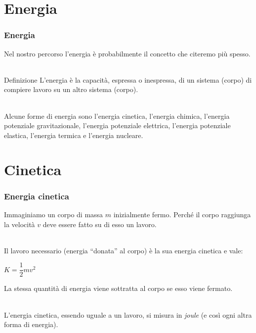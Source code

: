\documentclass[]{beamer}
\theoremstyle{plain}
\begin{document}
\section{Energia}


\begin{frame}
  \frametitle{Energia}
Nel nostro percorso l'energia è probabilmente il concetto che citeremo più spesso.\\~\pause
\begin{block}{Definizione}
  L'energia è la capacità, espressa o inespressa, di un sistema (corpo) di compiere lavoro su un altro sistema (corpo).
\end{block}~\pause\\
Alcune forme di energia sono l'energia cinetica, l'energia chimica, l'energia potenziale gravitazionale, l'energia potenziale elettrica, l'energia potenziale elastica, l'energia termica e l'energia nucleare.
\end{frame}

\section{Cinetica}

\begin{frame}
\frametitle{Energia cinetica}
Immaginiamo un corpo di massa $ m $ inizialmente fermo. Perché il corpo raggiunga la velocità $ v $ deve essere fatto su di esso un lavoro.\\~\pause

Il lavoro necessario (energia ``donata'' al corpo) è la sua \alert{energia cinetica} e vale:
\begin{center}
\colorbox{blue!30}{$ K = \dfrac{1}{2}mv^2 $}
\end{center}
La stessa quantità di energia viene sottratta al corpo se esso viene fermato.\\~\pause

L'energia cinetica, essendo uguale a un lavoro, si misura in \emph{joule} (e così ogni altra forma di energia).
\end{frame}
\end{document}
